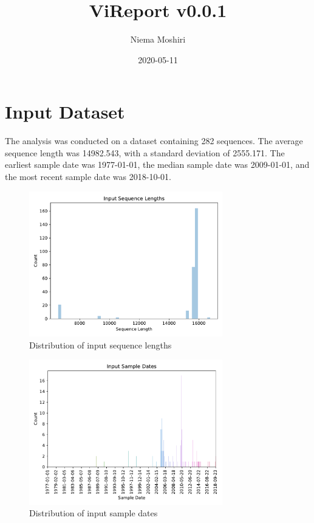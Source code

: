 \documentclass{article}
\title{\vspace{-2.0cm}ViReport v0.0.1}
\author{Niema Moshiri}
\date{2020-05-11}
\begin{document}
\maketitle

\section{Input Dataset}
The analysis was conducted on a dataset containing 282 sequences. The average sequence length was 14982.543, with a standard deviation of 2555.171. The earliest sample date was 1977-01-01, the median sample date was 2009-01-01, and the most recent sample date was 2018-10-01.

\begin{figure}[h]
\centering
\includegraphics[width=0.75\textwidth,keepaspectratio]{./figs/input_sequence_lengths.pdf}
\caption{Distribution of input sequence lengths}
\end{figure}



\begin{figure}[h]
\centering
\includegraphics[width=0.75\textwidth,keepaspectratio]{./figs/input_sample_dates.pdf}
\caption{Distribution of input sample dates}
\end{figure}
\end{document}
